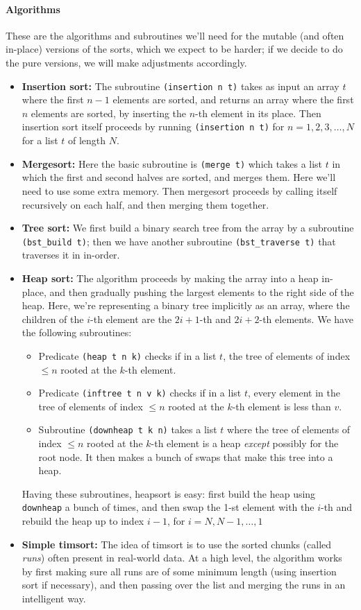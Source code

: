 \documentclass{article}
\begin{document}
\paragraph{Algorithms}
These are the algorithms and subroutines we'll need for the mutable (and often in-place) versions of the sorts, which we expect to be harder; if we decide to do the pure versions, we will make adjustments accordingly.
\begin{itemize}
  \item \textbf{Insertion sort:} The subroutine \verb|(insertion n t)| takes as input an array $t$ where the first $n-1$ elements are sorted, and returns an array where the first $n$ elements are sorted, by inserting the $n$-th element in its place. Then insertion sort itself proceeds by running \verb|(insertion n t)| for $n=1,2,3,\ldots,N$ for a list $t$ of length $N$. 
  \item \textbf{Mergesort:} Here the basic subroutine is \verb|(merge t)| which takes a list $t$ in which the first and second halves are sorted, and merges them. Here we'll need to use some extra memory. Then mergesort proceeds by calling itself recursively on each half, and then merging them together.
  \item \textbf{Tree sort:} We first build a binary search tree from the array by a subroutine \verb|(bst_build t)|; then we have another subroutine \verb|(bst_traverse t)| that traverses it in in-order.
  \item \textbf{Heap sort:} The algorithm proceeds by making the array into a heap in-place, and then gradually pushing the largest elements to the right side of the heap. Here, we're representing a binary tree implicitly as an array, where the children of the $i$-th element are the $2i+1$-th and $2i+2$-th elements. We have the following subroutines:
  \begin{itemize}
	\item Predicate \verb|(heap t n k)| checks if in a list $t$, the tree of elements of index $\leq n$ rooted at the $k$-th element.
	\item Predicate \verb|(inftree t n v k)| checks if in a list $t$, every element in the tree of elements of index $\leq n$ rooted at the $k$-th element is less than $v$.
	\item Subroutine \verb|(downheap t k n)| takes a list $t$ where the tree of elements of index $\leq n$ rooted at the $k$-th element is a heap \emph{except} possibly for the root node. It then makes a bunch of swaps that make this tree into a heap. 
\end{itemize}
Having these subroutines, heapsort is easy: first build the heap using \verb|downheap| a bunch of times, and then swap the 1-st element with the $i$-th and rebuild the heap up to index $i-1$, for $i = N, N-1, \ldots, 1$
  \item \textbf{Simple timsort:} The idea of timsort is to use the sorted chunks (called \emph{runs}) often present in real-world data. At a high level, the algorithm works by first making sure all runs are of some minimum length (using insertion sort if necessary), and then passing over the list and merging the runs in an intelligent way. 
  

\end{itemize}
\end{document}
